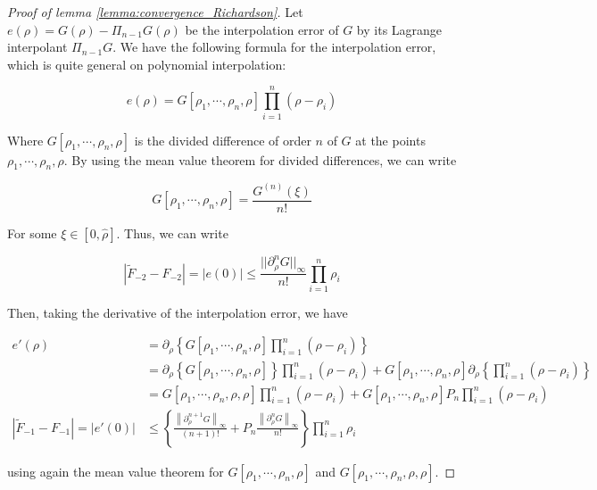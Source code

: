 ﻿\documentclass{article}
\begin{document}
\begin{proof}[Proof of lemma \ref{lemma:convergence_Richardson}] Let $e(\rho) = G(\rho) - \Pi_{n-1}G(\rho)$ be the interpolation error of $G$ by its Lagrange interpolant $\Pi_{n-1}G$. We have the following formula for the interpolation error, which is quite general on polynomial interpolation:

\begin{equation}
  e(\rho) = G[\rho_1, \cdots, \rho_n, \rho]\prod_{i=1}^{n}(\rho - \rho_i)
\end{equation}

Where $G[\rho_1, \cdots, \rho_n, \rho]$ is the divided difference of order $n$ of $G$ at the points $\rho_1, \cdots, \rho_n, \rho$. By using the mean value theorem for divided differences, we can write

\begin{equation}
  G[\rho_1, \cdots, \rho_n, \rho] = \frac{G^{(n)}(\xi)}{n!}
\end{equation}

For some $\xi \in [0, \hat\rho]$. Thus, we can write 

\begin{equation}
  \left|\widetilde F_{-2} - F_{-2}\right| = \left|e(0)\right| \leq \frac{||\partial^n_\rho G||_{\infty}}{n!}\prod_{i=1}^{n}\rho_i
\end{equation}

Then, taking the derivative of the interpolation error, we have

\begin{align*}
  e'(\rho) & = \partial_\rho\left\{G[\rho_1, \cdots, \rho_n, \rho]\prod_{i=1}^{n}(\rho - \rho_i)\right\} \\
  & = \partial_\rho\left\{G[\rho_1, \cdots, \rho_n, \rho]\right\}\prod_{i=1}^{n}(\rho - \rho_i) + G[\rho_1, \cdots, \rho_n, \rho]\partial_\rho\left\{\prod_{i=1}^{n}(\rho - \rho_i)\right\} \\
  & = G[\rho_1, \cdots, \rho_n, \rho, \rho]\prod_{i=1}^{n}(\rho - \rho_i) + G[\rho_1, \cdots, \rho_n, \rho]P_n\prod_{i=1}^{n}(\rho - \rho_i) \\
  \left|\widetilde F_{-1} - F_{-1}\right| = \left|e'(0)\right| & \leq \left\{\frac{\left\|\partial_\rho^{n+1}G\right\|_{\infty}}{(n+1)!}+P_n\frac{\left\|\partial_\rho^{n}G\right\|_{\infty}}{n!}\right\}\prod_{i=1}^{n}\rho_i
\end{align*}

using again the mean value theorem for $G[\rho_1, \cdots, \rho_n, \rho]$ and $G[\rho_1, \cdots, \rho_n, \rho, \rho]$.

\end{proof}
\end{document}

